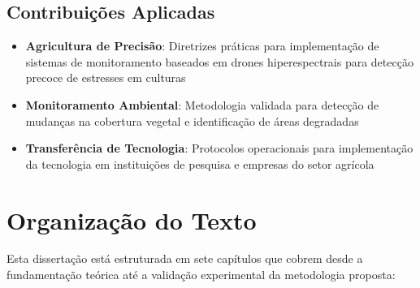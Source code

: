 \subsection{Contribuições Aplicadas}
\begin{itemize}
    \item \textbf{Agricultura de Precisão}: Diretrizes práticas para implementação de sistemas de monitoramento baseados em drones hiperespectrais para detecção precoce de estresses em culturas
    
    \item \textbf{Monitoramento Ambiental}: Metodologia validada para detecção de mudanças na cobertura vegetal e identificação de áreas degradadas
    
    \item \textbf{Transferência de Tecnologia}: Protocolos operacionais para implementação da tecnologia em instituições de pesquisa e empresas do setor agrícola
\end{itemize}

\section{Organização do Texto}\label{sec:organizacao}

Esta dissertação está estruturada em sete capítulos que cobrem desde a fundamentação teórica até a validação experimental da metodologia proposta:

